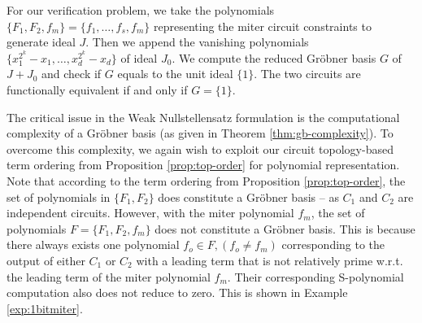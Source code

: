 For our verification problem, we take the polynomials $\{F_1, F_2,
f_m\} = \{f_1, \dots, f_s, f_m\}$  representing the miter circuit
constraints to generate ideal $J$. Then we append the vanishing
polynomials $\{x_1^{2^k} - x_1, \dots, x_d^{2^k} - x_d\}$ of ideal
$J_0$. We compute the reduced Gr\"{o}bner basis $G$ of $J+J_0$ and
check if $G$ equals to the unit ideal $\{1\}$. The two circuits are
functionally equivalent if and only if $G = \{1\}$.

The critical issue in the Weak Nullstellensatz formulation is the
computational complexity of a Gr\"obner basis (as given in
Theorem \ref{thm:gb-complexity}). 
To overcome this complexity, we again wish to exploit our
circuit topology-based term ordering from Proposition
\ref{prop:top-order} for polynomial representation.  
Note that according to the term ordering from Proposition
\ref{prop:top-order}, the set of polynomials in $\{F_1,F_2\}$ does
constitute a Gr\"obner basis -- as $C_1$ and $C_2$ are independent
circuits. However, with the miter polynomial $f_m$, the set of
polynomials $F = \{F_1, F_2, f_m\}$ 
does not constitute a Gr\"obner basis. This is because there always
exists one polynomial $f_o \in F, (f_o \neq f_m)$ corresponding to the 
output of either $C_1$ or $C_2$ with a leading term that is not
relatively prime w.r.t. the leading term of the miter polynomial
$f_m$. Their corresponding S-polynomial computation also does not
reduce to zero. This is shown in Example \ref{exp:1bitmiter}.   

	




